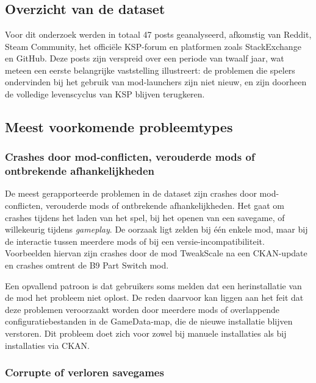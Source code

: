 \chapter{}%
\label{ch:probleemanalyse}

\section{Overzicht van de dataset}

Voor dit onderzoek werden in totaal 47 posts geanalyseerd, afkomstig van Reddit, Steam Community, het officiële KSP-forum en platformen zoals StackExchange en GitHub. Deze posts zijn verspreid over een periode van twaalf jaar, wat meteen een eerste belangrijke vaststelling illustreert: de problemen die spelers ondervinden bij het gebruik van mod-launchers zijn niet nieuw, en zijn doorheen de volledige levenscyclus van KSP blijven terugkeren.

\section{Meest voorkomende probleemtypes}

\subsection{Crashes door mod-conflicten, verouderde mods of ontbrekende afhankelijkheden}

De meest gerapporteerde problemen in de dataset zijn crashes door mod-conflicten, verouderde mods of ontbrekende afhankelijkheden. Het gaat om crashes tijdens het laden van het spel, bij het openen van een savegame, of willekeurig tijdens \textit{gameplay}. De oorzaak ligt zelden bij één enkele mod, maar bij de interactie tussen meerdere mods of bij een versie-incompatibiliteit. Voorbeelden hiervan zijn crashes door de mod TweakScale na een CKAN-update en crashes omtrent de B9 Part Switch mod.

Een opvallend patroon is dat gebruikers soms melden dat een herinstallatie van de mod het probleem niet oplost. De reden daarvoor kan liggen aan het feit dat deze problemen veroorzaakt worden door meerdere mods of overlappende configuratiebestanden in de GameData-map, die de nieuwe installatie blijven verstoren. Dit probleem doet zich voor zowel bij manuele installaties als bij installaties via CKAN.

\subsection{Corrupte of verloren savegames}

